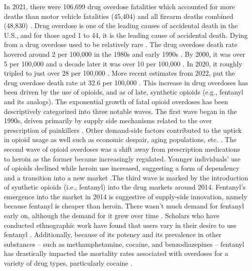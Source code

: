 In 2021, there were 106,699 drug overdose fatalities which accounted for more deaths than motor vehicle fatalities (45,404) and all firearm deaths combined (48,830) \parencite{center_for_disease_control_and_prevention_injuries_2023}. Drug overdose is one of the leading causes of accidental death in the U.S., and for those aged 1 to 44, it is the leading cause of accidental death. Dying from a drug overdose used to be relatively rare \parencite{center_for_disease_control_and_prevention_national_2023}. The drug overdose death rate hovered around 2 per 100,000 in the 1980s and early 1990s \parencite{warner_drug_2011}. By 2000, it was over 5 per 100,000 and a decade later it was over 10 per 100,000 \parencite{rudd_increases_2016}. In 2020, it roughly tripled to just over 28 per 100,000 \parencite{hedegaard_drug_2021}. More recent estimates from 2022, put the drug overdose death rate at 32.6 per 100,000 \parencite{spencer_drug_2024}. This increase in drug overdoses has been driven by the use of opioids, and as of late, synthetic opioids (e.g., fentanyl and its analogs). The exponential growth of fatal opioid overdoses has been descriptively categorized into three notable waves. The first wave began in the 1990s, driven primarily by supply side mechanisms related to the over prescription of painkillers \parencite{kolodny_prescription_2015}. Other demand-side factors contributed to the uptick in opioid usage as well such as economic despair, aging populations, etc. \parencite{dasgupta_opioid_2018}. The second wave of opioid overdoses was a shift away from prescription medications to heroin as the former became increasingly regulated. Younger individuals’ use of opioids declined while heroin use increased, suggesting a form of dependency and a transition into a new market \parencite{unick_us_2017}.The third wave is marked by the introduction of synthetic opioids (i.e., fentanyl) into the drug markets around 2014. Fentanyl’s emergence into the market in 2014 is suggestive of supply-side innovation, namely because fentanyl is cheaper than heroin. There wasn't much demand for fentanyl early on, although the demand for it grew over time \parencite{powell_evolving_2021}. Scholars who have conducted ethnographic work have found that users vary in their desire to use fentanyl \parencite{carroll_exposure_2017, mars_illicit_2019}. Additionally, because of its potency \parencite{ciccarone_fentanyl_2017} and its prevalence in other substances – such as methamphetamine, cocaine, and benzodiazepines – fentanyl has drastically impacted the mortality rates associated with overdoses for a variety of drug types, particularly cocaine \parencite{humphreys_responding_2022}.

